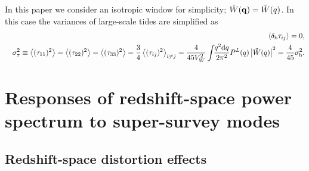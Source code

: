 \documentclass[prd,onecolumn,notitlepage,amsmath,amssymb,floatfix,superscriptaddress]{revtex4-1}
\newcommand{\bq}{{\bf q}}
\newcommand{\tW}{\tilde{W}}
\newcommand{\br}{{\rm b}}
\def\avrg#1{\left\langle #1 \right\rangle}
\begin{document}
In this paper we consider an isotropic window for simplicity; $\tW(\bq)=\tW(q)$. In this case
the variances of large-scale tides are simplified as
%
\begin{eqnarray}
&&\avrg{\delta_\br\tau_{ij}}=0,\nonumber\\
&&\sigma_\tau^2\equiv \avrg{(\tau_{11})^2}=\avrg{(\tau_{22})^2}=\avrg{(\tau_{33})^2}=\frac{3}{4}\avrg{(\tau_{ij})^2}_{i\ne j}
=\frac{4}{45V_W^2}\int\!\!\frac{q^2\mathrm{d}q}{2\pi^2}P^L(q)\left|\tW(q)\right|^2=\frac{4}{45}\sigma_\br^2.
\end{eqnarray}



\section{Responses of redshift-space power spectrum to super-survey modes}
\label{sec:response}

\subsection{Redshift-space distortion effects}
\end{document}
